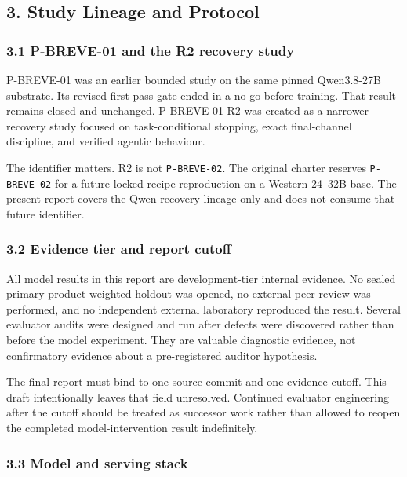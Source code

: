 \documentclass[
  9pt,
  letterpaper,
]{article}
\begin{document}
\hypertarget{3-study-lineage-and-protocol}{%
\subsection{3. Study Lineage and
Protocol}\label{3-study-lineage-and-protocol}}

\hypertarget{31-p-breve-01-and-the-r2-recovery-study}{%
\subsubsection{3.1 P-BREVE-01 and the R2 recovery
study}\label{31-p-breve-01-and-the-r2-recovery-study}}

P-BREVE-01 was an earlier bounded study on the same pinned Qwen3.8-27B
substrate. Its revised first-pass gate ended in a no-go before training.
That result remains closed and unchanged. P-BREVE-01-R2 was created as a
narrower recovery study focused on task-conditional stopping, exact
final-channel discipline, and verified agentic behaviour.

The identifier matters. R2 is not \texttt{P-BREVE-02}. The original
charter reserves \texttt{P-BREVE-02} for a future locked-recipe
reproduction on a Western 24--32B base. The present report covers the
Qwen recovery lineage only and does not consume that future identifier.

\hypertarget{32-evidence-tier-and-report-cutoff}{%
\subsubsection{3.2 Evidence tier and report
cutoff}\label{32-evidence-tier-and-report-cutoff}}

All model results in this report are development-tier internal evidence.
No sealed primary product-weighted holdout was opened, no external peer
review was performed, and no independent external laboratory reproduced
the result. Several evaluator audits were designed and run after defects
were discovered rather than before the model experiment. They are
valuable diagnostic evidence, not confirmatory evidence about a
pre-registered auditor hypothesis.

The final report must bind to one source commit and one evidence cutoff.
This draft intentionally leaves that field unresolved. Continued
evaluator engineering after the cutoff should be treated as successor
work rather than allowed to reopen the completed model-intervention
result indefinitely.

\hypertarget{33-model-and-serving-stack}{%
\subsubsection{3.3 Model and serving
stack}\label{33-model-and-serving-stack}}
\end{document}
